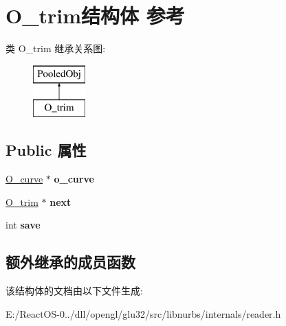 \hypertarget{struct_o__trim}{}\section{O\+\_\+trim结构体 参考}
\label{struct_o__trim}
类 O\+\_\+trim 继承关系图\+:\begin{figure}[H]
\begin{center}
\leavevmode
\includegraphics[height=2.000000cm]{struct_o__trim}
\end{center}
\end{figure}
\subsection*{Public 属性}
\begin{DoxyCompactItemize}
\item 
\mbox{\label{struct_o__trim_a3a039d5f864d7b9c03329b90cba777a3}} 
\hyperlink{struct_o__curve}{O\+\_\+curve} $\ast$ {\bfseries o\+\_\+curve}
\item 
\mbox{\label{struct_o__trim_aefe4a175eb8549f86baa205a0f531d17}} 
\hyperlink{struct_o__trim}{O\+\_\+trim} $\ast$ {\bfseries next}
\item 
\mbox{\label{struct_o__trim_a792bcb5f248b02908b2f24eb1111f3f6}} 
int {\bfseries save}
\end{DoxyCompactItemize}
\subsection*{额外继承的成员函数}


该结构体的文档由以下文件生成\+:\begin{DoxyCompactItemize}
\item 
E\+:/\+React\+O\+S-\/0../dll/opengl/glu32/src/libnurbs/internals/reader.\+h\end{DoxyCompactItemize}
